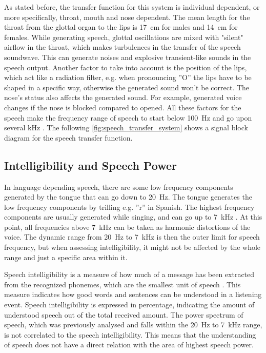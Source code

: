 As stated before, the transfer function for this system is individual dependent, or more specifically, throat, mouth and nose dependent. The mean length for the throat from the glottal organ to the lips is \SI{17}{\centi\meter} for males and \SI{14}{\centi\meter} for females. While generating speech, glottal oscillations are mixed with "silent" airflow in the throat, which makes turbulences in the transfer of the speech soundwave. This can generate noises and explosive transient-like sounds in the speech output. Another factor to take into account is the position of the lips, which act like a radiation filter, e.g. when pronouncing ''O'' the lips have to be shaped in a specific way, otherwise the generated sound won't be correct. The nose's status also affects the generated sound. For example, generated voice changes if the nose is blocked compared to opened. All these factors for the speech make the frequency range of speech to start below \SI{100}{\hertz} and go upon several \si{\kilo\hertz} \citep{pulkki2015}. The following \autoref{fig:speech_transfer_system} shows a signal block diagram for the speech transfer function.


\subsection{Intelligibility and Speech Power}

In language depending speech, there are some low frequency components generated by the tongue that can go down to \SI{20}{\hertz}. The tongue generates the low frequency components by trilling e.g. ''r'' in Spanish. The highest frequency components are usually generated while singing, and can go up to \SI{7}{\kilo\hertz} \citep{pulkki2015}. At this point, all frequencies above \SI{7}{\kilo\hertz} can be taken as harmonic distortions of the voice. The dynamic range from \SI{20}{\hertz} to \SI{7}{\kilo\hertz} is then the outer limit for speech frequency, but when assessing intelligibility, it might not be affected by the whole range and just a specific area within it.

Speech intelligibility is a measure of how much of a message has been extracted from the recognized phonemes, which are the smallest unit of speech \citep{arl_us_army}. This measure indicates how good words and sentences can be understood in a listening event. Speech intelligibility  is expressed in percentage, indicating the amount of understood speech out of the total received amount. The power spectrum of speech, which was previously analysed and falls within the \SI{20}{\hertz} to \SI{7}{\kilo\hertz} range, is not correlated to the speech intelligibility. This means that the understanding of speech does not have a direct relation with the area of highest speech power. 

